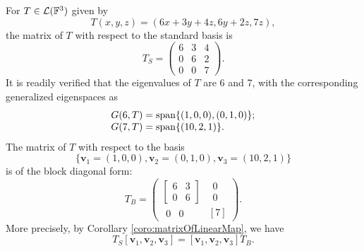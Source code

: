 \begin{exm}
  \label{exm:blockMatrixFormExam}
  For $T\in{\cal L}(\mathbb{F}^3)$ given by
  \begin{equation}
    \label{eq:blockMatrixFormExam}
    T(x,y,z) =(6x+3y+4z, 6y+2z, 7z),
  \end{equation}
  the matrix of $T$ with respect to the standard basis is
  \begin{displaymath}
    T_S = \begin{pmatrix}
      6 & 3 & 4
      \\
      0 & 6 & 2
      \\
      0 & 0 & 7
    \end{pmatrix}.
  \end{displaymath}
  It is readily verified that
  the eigenvalues of $T$ are 6 and 7, with
  the corresponding generalized eigenspaces as
  \begin{displaymath}
    \begin{array}{l}
      G(6,T) = \mathrm{span}\{(1,0,0),(0,1,0)\};
      \\
      G(7,T) = \mathrm{span}\{(10,2,1)\}.
    \end{array}
  \end{displaymath}
  The matrix of $T$ with respect to the basis
  \begin{displaymath}
    \{\mathbf{v}_1=(1,0,0), 
    \mathbf{v}_2=(0,1,0), 
    \mathbf{v}_3=(10,2,1)\}
  \end{displaymath}
  is of the block diagonal form:
  \begin{displaymath}
    T_B = 
    \left(
      \begin{array}{cc}
        \left[
        \begin{array}{cc}
          6 & 3
          \\
          0 & 6
        \end{array}
              \right]
            &
              \begin{array}{c}
                0 \\ 0
              \end{array}
        \\
        \begin{array}{cc}
          0 & 0
        \end{array}
            &
              [7]
      \end{array}
    \right).
  \end{displaymath}
  More precisely,
  by Corollary \ref{coro:matrixOfLinearMap},
  we have
  \begin{displaymath}
    T_S[\mathbf{v}_1, \mathbf{v}_2, \mathbf{v}_3] = [\mathbf{v}_1, \mathbf{v}_2, \mathbf{v}_3]T_B.
  \end{displaymath}
\end{exm}

